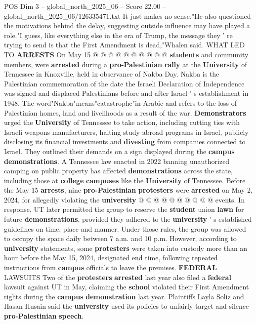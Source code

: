 \begin{textsample}{POS Dim 3 – global\_north\_2025\_06 – Score 22.00 – global\_north\_2025\_06/126335471.txt}
It just makes no sense."He also questioned the motivations behind the delay, suggesting outside influence may have played a role."I guess, like everything else in the era of Trump, the message they ' re trying to send is that the First Amendment is dead,"Whalen said.
WHAT LED TO \textbf{ARRESTS} On May 15 @ @ @ @ @ @ @ @ @ @ \textbf{students} and community members, were \textbf{arrested} during a \textbf{pro-Palestinian} \textbf{rally} at the \textbf{University} of Tennessee in Knoxville, held in observance of Nakba Day.
Nakba is the Palestinian commemoration of the date the Israeli Declaration of Independence was signed and displaced Palestinians before and after Israel ' s establishment in 1948.
The word"Nakba"means"catastrophe"in Arabic and refers to the loss of Palestinian homes, land and livelihoods as a result of the war. \textbf{Demonstrators} urged the \textbf{University} of Tennessee to take action, including cutting ties with Israeli weapons manufacturers, halting study abroad programs in Israel, publicly disclosing its financial investments and \textbf{divesting} from companies connected to Israel.
They outlined their demands on a sign displayed during the \textbf{campus} \textbf{demonstrations}.
A Tennessee law enacted in 2022 banning unauthorized camping on public property has affected \textbf{demonstrations} across the state, including those at \textbf{college} \textbf{campuses} like the \textbf{University} of Tennessee.
Before the May 15 \textbf{arrests}, nine \textbf{pro-Palestinian} \textbf{protesters} were \textbf{arrested} on May 2, 2024, for allegedly violating the \textbf{university} @ @ @ @ @ @ @ @ @ @ events.
In response, UT later permitted the group to reserve the \textbf{student} union \textbf{lawn} for future \textbf{demonstrations}, provided they adhered to the \textbf{university} ' s established guidelines on time, place and manner.
Under those rules, the group was allowed to occupy the space daily between 7 a.m. and 10 p.m.
However, according to \textbf{university} statements, some \textbf{protesters} were taken into custody more than an hour before the May 15, 2024, designated end time, following repeated instructions from \textbf{campus} officials to leave the premises. \textbf{FEDERAL} LAWSUITS Two of the \textbf{protesters} \textbf{arrested} last year also filed a \textbf{federal} lawsuit against UT in May, claiming the \textbf{school} violated their First Amendment rights during the \textbf{campus} \textbf{demonstration} last year.
Plaintiffs Layla Soliz and Hasan Husain said the \textbf{university} used its policies to unfairly target and silence \textbf{pro-Palestinian} \textbf{speech}.

\end{textsample}
